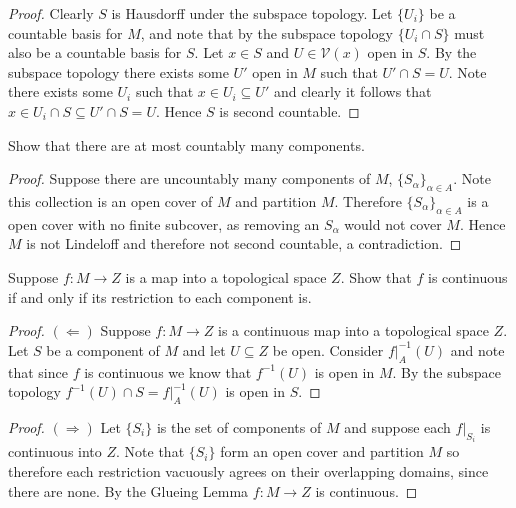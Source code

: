 \documentclass[minion]{homework651}
\begin{document}
\begin{problems}
\begin{subproblems}
\begin{proof}
    Clearly $S$ is Hausdorff under the subspace topology. Let $\{U_i\}$ be a countable basis for $M$, 
    and note that by the subspace topology $\{U_i \cap S\}$ must also be a countable basis for $S$. 
    Let $x \in S$ and $U \in \mathcal{V}(x)$ open in $S$. By the subspace topology 
    there exists some $U'$ open in $M$ such that $U' \cap S = U$. Note there exists some $U_i$ such that $x \in U_i \subseteq U'$
    and clearly it follows that $x \in U_i \cap S \subseteq U'\cap S = U$. Hence $S$ is second countable. 
\end{proof}



\item Show that there are at most countably many components.
\begin{proof}
    Suppose there are uncountably many components of $M$, $\{S_\alpha\}_{\alpha \in A}$. Note this collection
    is an open cover of $M$ and partition $M$. Therefore $\{S_\alpha\}_{\alpha \in A}$ is a open cover with no 
    finite subcover, as removing an $S_\alpha$ would not cover $M$. Hence $M$ is not Lindeloff and therefore not second countable, 
    a contradiction. 
\end{proof}
\item Suppose $f:M\to Z$ is a map into a topological space $Z$. Show
that $f$ is continuous if and only if its restriction to each component is.
\begin{proof}$(\Leftarrow)$ Suppose $f:M\to Z$ is a continuous map into a topological space $Z$.
    Let $S$ be a component of $M$ and let $U \subseteq Z$ be open. Consider $f|_A^{-1}(U)$ and note that 
    since $f$ is continuous we know that $f^{-1}(U)$ is open in $M$. By the subspace topology $f^{-1}(U) \cap S = f|_A^{-1}(U)$ 
    is open in $S$. 
\end{proof}

\begin{proof}$(\Rightarrow)$ Let $\{S_i\}$ is the set of components of $M$ and suppose 
    each $f|_{S_i}$ is continuous into $Z$. Note that $\{S_i\}$ form an open cover
    and partition $M$ so therefore each restriction vacuously agrees on their overlapping domains, since there are none. 
    By the Glueing Lemma $f:M \to Z$ is continuous. 
\end{proof}





\end{subproblems}
\end{problems}
\end{document}
